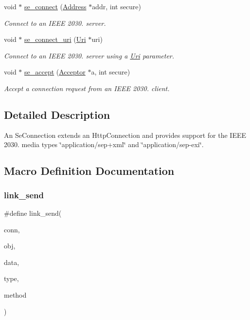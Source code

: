 \begin{DoxyCompactItemize}
void $\ast$ \hyperlink{group__se__connection_ga46a034b6bbe2211018b10b0eba5d96be}{se\+\_\+connect} (\hyperlink{group__address_ga80f2dcdb3778441e85ac8c9dbb6f324a}{Address} $\ast$addr, int secure)
\begin{DoxyCompactList}\small\item\em Connect to an I\+E\+EE 2030. server. \end{DoxyCompactList}\item 
void $\ast$ \hyperlink{group__se__connection_gad174138f5dd085fa16adcdccf495083e}{se\+\_\+connect\+\_\+uri} (\hyperlink{structUri}{Uri} $\ast$uri)
\begin{DoxyCompactList}\small\item\em Connect to an I\+E\+EE 2030. server using a \hyperlink{structUri}{Uri} parameter. \end{DoxyCompactList}\item 
void $\ast$ \hyperlink{group__se__connection_gafda63e89032e1e11058c4632e3f63bec}{se\+\_\+accept} (\hyperlink{group__tcp_ga99fb3ed761c86c0379dc50f80c51c87a}{Acceptor} $\ast$a, int secure)
\begin{DoxyCompactList}\small\item\em Accept a connection request from an I\+E\+EE 2030. client. \end{DoxyCompactList}\end{DoxyCompactItemize}


\subsection{Detailed Description}
An Se\+Connection extends an Http\+Connection and provides support for the I\+E\+EE 2030. media types \char`\"{}application/sep+xml\char`\"{} and \char`\"{}application/sep-\/exi\char`\"{}. 

\subsection{Macro Definition Documentation}
\mbox{\label{group__se__connection_ga4d13cea2846403e4c14305d14b314e93}} 
\subsubsection{\texorpdfstring{link\+\_\+send}{link\_send}}
{\footnotesize\ttfamily \#define link\+\_\+send(\begin{DoxyParamCaption}\item[{}]{conn,  }\item[{}]{obj,  }\item[{}]{data,  }\item[{}]{type,  }\item[{}]{method }\end{DoxyParamCaption})}

